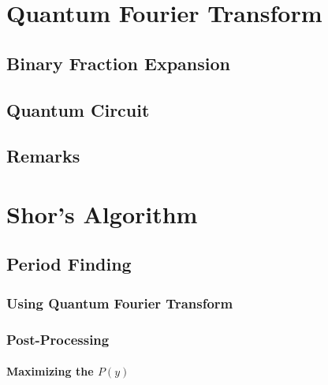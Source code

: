	\section{Quantum Fourier Transform} %
		\label{sec:qft}


		\subsection{Binary Fraction Expansion} %

		\subsection{Quantum Circuit} %

		\subsection{Remarks} %

	\section{Shor's Algorithm} %
		\label{sec:shors}


		\subsection{Period Finding} %

			\subsubsection{Using Quantum Fourier Transform} %

			\subsubsection{Post-Processing} %

				\paragraph{Maximizing the \(P(y)\)} %

